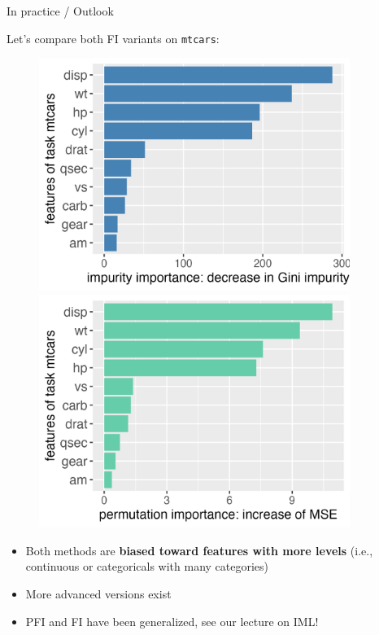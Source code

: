 \documentclass[11pt,compress,t,notes=noshow, xcolor=table]{beamer}
\begin{document}
\begin{vbframe}{In practice / Outlook}

{\small
  Let's compare both FI variants on \texttt{mtcars}:
}
\begin{figure}
\centering
\begin{minipage}{.5\textwidth}
  \centering
  \includegraphics[width=0.9\textwidth]{figure/forest-fimp_gini.png}
\end{minipage}%
\begin{minipage}{.5\textwidth}
  \centering
  \includegraphics[width=0.9\textwidth]{figure/forest-fimp_perm.png}
\end{minipage}
\end{figure}


\lz
\begin{itemize}

  \item Both methods are \textbf{biased toward features with more levels} (i.e., continuous or categoricals with many categories) 
  \item More advanced versions exist
  \item PFI and FI have been generalized, see our lecture on IML!

\end{itemize}
\end{vbframe}

\endlecture
\end{document}
